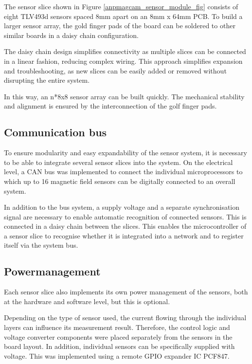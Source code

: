 \documentclass[conference]{IEEEtran}
\begin{document}
The sensor slice shown in Figure \ref{anpmagcam_sensor_module_fig} consists of eight TLV493d sensors spaced 8mm apart on an 8mm x 64mm PCB.
To build a larger sensor array, the gold finger pads of the board can be soldered to other similar boards in a daisy chain configuration.

The daisy chain design simplifies connectivity as multiple slices can be connected in a linear fashion, reducing complex wiring.
This approach simplifies expansion and troubleshooting, as new slices can be easily added or removed without disrupting the entire system.

In this way, an n*8x8 sensor array can be built quickly. The mechanical stability and alignment is ensured by the interconnection of the golf finger pads.

\subsection{Communication bus}

To ensure modularity and easy expandability of the sensor system, it is necessary to be able to integrate several sensor slices into the system.
On the electrical level, a CAN bus was implemented to connect the individual microprocessors to which up to 16 magnetic field sensors can be digitally connected to an overall system.

In addition to the bus system, a supply voltage and a separate synchronisation signal are necessary to enable automatic recognition of connected sensors. This is connected in a daisy chain between the slices.
This enables the microcontroller of a sensor slice to recognise whether it is integrated into a network and to register itself via the system bus.



\subsection{Powermanagement}

Each sensor slice also implements its own power management of the sensors, both at the hardware and software level, but this is optional.

Depending on the type of sensor used, the current flowing through the individual layers can influence its measurement result.
Therefore, the control logic and voltage converter components were placed separately from the sensors in the board layout.
In addition, individual sensors can be specifically supplied with voltage. This was implemented using a remote GPIO expander IC PCF847.
\end{document}
